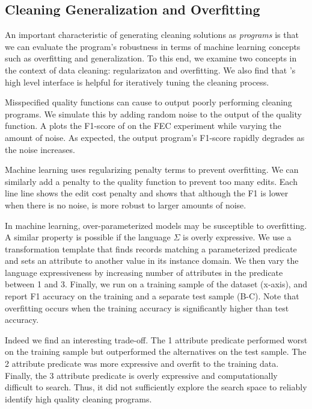 \subsection*{Cleaning Generalization and Overfitting}\label{s:expoverfit}
An important characteristic of generating cleaning solutions as {\it programs} is that we can evaluate the program's robustness in terms of machine learning concepts such as overfitting and generalization.    To this end, we examine two concepts in the context of data cleaning: regularizaton and overfitting.  We also find that \sys's high level interface is helpful for iteratively tuning the cleaning process.

  Misspecified quality functions can cause \sys to output poorly performing cleaning programs.  We simulate this by adding random noise to the output of the quality function. A plots the F1-score of \sys on the FEC experiment while varying the amount of noise.  As expected, the output program's F1-score rapidly degrades as the noise increases.  

Machine learning uses regularizing penalty terms to prevent overfitting.  We can similarly add a penalty to the quality function to prevent too many edits.  Each line line shows the edit cost penalty and shows that although the F1 is lower when there is no noise, \sys is more robust to larger amounts of noise. 

 In machine learning, over-parameterized models may be susceptible to overfitting.  A similar property is possible if the language $\Sigma$ is overly expressive.  We use a transformation template that finds records matching a parameterized predicate and sets an attribute to another value in its instance domain.   We then vary the language expressiveness by increasing number of attributes in the predicate between 1 and 3.  Finally, we run \sys on a training sample of the dataset (x-axis), and report F1 accuracy on the training and a separate test sample (B-C).  Note that overfitting occurs when the training accuracy is significantly higher than test accuracy.

Indeed we find an interesting trade-off.  The 1 attribute predicate performed worst on the training sample but outperformed the alternatives on the test sample.  The 2 attribute predicate was more expressive and overfit to the training data.  Finally, the 3 attribute predicate is overly expressive and computationally difficult to search.  Thus, it did not sufficiently explore the search space to reliably identify high quality cleaning programs. 

